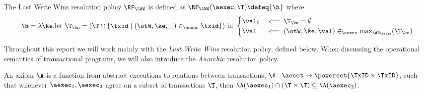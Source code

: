 \begin{definition}
\label{def:lww}
The Last Write Wins resolution policy $\RP_{\LWW}$ is defined as 
$\RP_{\LWW}(\aexec, \T) \defeq \{\h\}$ where
\[
\h = \lambda \ke. \text{let } \T_{\ke} = ( \T \cap \{\txid \mid (\otW,\ke, \_) \in_{\aexec} \txid\})  \text{ in }
\begin{cases}
\val_{0} &\impliedby \T_{\ke} =  \emptyset\\
\val &\impliedby (\otW, \ke, \val) \in_{\aexec} \max_{\AR_{\aexec}}(\T_{\ke})
\end{cases}
\]
\end{definition}

Throughout this report we will work mainly with the \emph{Last Write Wins} resolution policy, defined below. 
When discussing the operational semantics of transactional programs, 
we will also introduce the \emph{Anarchic} resolution policy.

\begin{definition}
An axiom $\A$ is a function from abstract executions to relations between 
transactions, $\A: \aeset \rightarrow \powerset{\TxID \times \TxID}$, 
such that whenever $\aexec_1, \aexec_2$ agree on a subset of 
transactions $\T$, then $\A(\aexec_1) \cap (\T \times \T) \subseteq \A(\aexec_2)$.
\end{definition}


